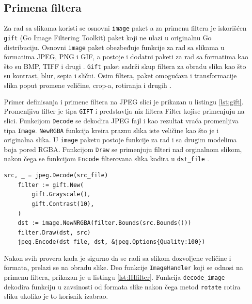 \documentclass[12pt,oneside]{memoir}
\begin{document}
\subsection{Primena filtera}

Za rad sa slikama koristi se osnovni \texttt{image} paket a za primenu filtera je iskorišćen \texttt{gift} (Go Image Filtering Toolkit) paket \cite{gift} koji ne ulazi u originalnu Go distribuciju. Osnovni \texttt{image} paket obezbeđuje funkcije za rad sa slikama u formatima JPEG, PNG i GIF, a postoje i dodatni paketi za rad sa formatima kao što su BMP, TIFF i drugi \cite{image}. \texttt{Gift} paket sadrži skup filtera za obradu slika kao što su kontrast, blur, sepia i slični. Osim filtera, paket omogućava i transformacije slika poput promene veličine, crop-a, rotiranja i drugih \cite{gift}.

Primer definisanja i primene filtera na JPEG slici je prikazan u listingu \ref{lst:gift}. Promenljiva filter je tipa  \texttt{GIFT} i predstavlja niz filtera Filter kojise primenjuju na slici. Funkcijom  \texttt{Decode} se dekodira JPEG fajl i kao rezultat vraća promenljiva tipa  \texttt{Image}.  \texttt{NewRGBA} funkcija kreira praznu slika iste veličine kao što je i originalna slika. U \texttt{image} paketu postoje funkcije za rad i sa drugim modelima boja pored RGBA. Funkcijom  \texttt{Draw} se primenjuju filteri nad orginalnom slikom, nakon čega se funkcijom  \texttt{Encode} filterovana slika kodira u  \texttt{dst\_file} \cite{gift}.

\begin{center}
\begin{lstlisting}[caption=Definisanje i primena filtera,label={lst:gift},  backgroundcolor=\color{background}]
	src, _ = jpeg.Decode(src_file)
	filter := gift.New(
		gift.Grayscale(),
		gift.Contrast(10),
	)
	dst := image.NewNRGBA(filter.Bounds(src.Bounds()))
	filter.Draw(dst, src)
	jpeg.Encode(dst_file, dst, &jpeg.Options{Quality:100})
\end{lstlisting}
\end{center}

Nakon svih provera kada je sigurno da se radi sa slikom dozvoljene veličine i formata, prelazi se na obradu slike. Deo funkcije  \texttt{ImageHandler} koji se odnosi na primenu filtera, prikazan je u listingu \ref{lst:IHfilter}. Funkcija  \texttt{decode\_image} dekodira funkciju u zavsinosti od formata slike nakon čega metod  \texttt{rotate} rotira sliku ukoliko je to korisnik izabrao. 
\end{document}
